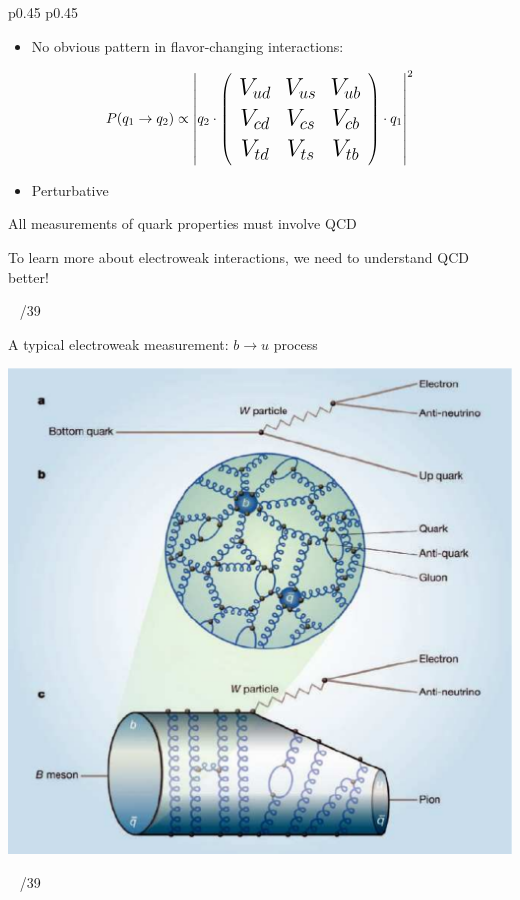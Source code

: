 \documentclass[landscape]{article}
\newenvironment{slide}[1][ ]{}{\mbox{ } \hfill \arabic{page}/39 \pagebreak}
\begin{document}
\begin{slide}
\begin{center}
\begin{tabular}{p{0.45\linewidth} p{0.45\linewidth}}
\begin{minipage}{\linewidth}
\begin{itemize}
  \item No obvious pattern in flavor-changing interactions:

\end{itemize}

\[ \LARGE P(q_1 \to q_2) \propto \left| q_2 \cdot \left(\begin{array}{c c c} V_{ud} & V_{us} & V_{ub} \\ V_{cd} & V_{cs} & V_{cb} \\ V_{td} & V_{ts} & V_{tb} \end{array} \right) \cdot q_1 \right|^2 \]

\begin{itemize}

  \item Perturbative

\end{itemize}
\end{minipage}
\end{tabular}
\end{center}

\vfill
All measurements of quark properties must involve QCD

\vfill
To learn more about electroweak interactions, we need to understand QCD better!

\vfill

\end{slide}


\begin{slide}

A typical electroweak measurement: $b \to u$ process

\begin{center}
\includegraphics[width=0.7\linewidth]{ians_figure}
\end{center}
\vspace{-0.5 cm}

\end{slide}
\end{document}
